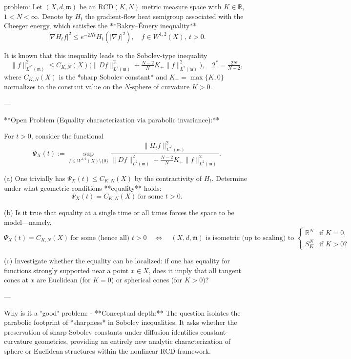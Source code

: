 problem:  
Let \((X,d,\mathfrak{m})\) be an \(\mathrm{RCD}(K,N)\) metric measure space with \(K \in \mathbb{R}\), \(1<N<\infty\).  
Denote by \(H_t\) the gradient-flow heat semigroup associated with the Cheeger energy, which satisfies the **Bakry–Émery inequality**
\[
|\nabla H_t f|^2 \le e^{-2Kt} H_t(|\nabla f|^2), \quad f \in W^{1,2}(X), \ t>0.
\]

It is known that this inequality leads to the Sobolev-type inequality
\[
\|f\|_{L^{2^*}(\mathfrak{m})}^2
\le C_{K,N}(X)\big(\|Df\|_{L^2(\mathfrak{m})}^2 + \tfrac{N-2}{N}K_+\|f\|_{L^2(\mathfrak{m})}^2\big),
\quad 2^*=\tfrac{2N}{N-2},
\]
where \(C_{K,N}(X)\) is the *sharp Sobolev constant* and \(K_+ = \max\{K,0\}\) normalizes to the constant value on the \(N\)-sphere of curvature \(K>0\).

---

**Open Problem (Equality characterization via parabolic invariance):**  

For \(t>0\), consider the functional  
\[
\Psi_X(t)
:= \sup_{f\in W^{1,2}(X)\setminus\{0\}}
\frac{\|H_t f\|_{L^{2^*}(\mathfrak{m})}^2}{
\|Df\|_{L^2(\mathfrak{m})}^2 + \tfrac{N-2}{N}K_+\|f\|_{L^2(\mathfrak{m})}^2}.
\]

(a) One trivially has \(\Psi_X(t)\le C_{K,N}(X)\) by the contractivity of \(H_t\).  
Determine under what geometric conditions **equality** holds:
\[
\Psi_X(t)=C_{K,N}(X)\ \text{for some }t>0.
\]

(b) Is it true that equality at a single time or all times forces the space to be model—namely,
\[
\Psi_X(t)=C_{K,N}(X)\ \text{for some (hence all) }t>0
\quad\Longleftrightarrow\quad
(X,d,\mathfrak{m})\text{ is isometric (up to scaling) to } 
\begin{cases}
\mathbb{R}^N & \text{if }K=0,\\
S^N_K & \text{if }K>0 ?
\end{cases}
\]

(c) Investigate whether the equality can be localized: if one has equality for functions strongly supported near a point \(x\in X\), does it imply that all tangent cones at \(x\) are Euclidean (for \(K=0\)) or spherical cones (for \(K>0\))?

---

Why is it a "good" problem:  
- **Conceptual depth:** The question isolates the parabolic footprint of *sharpness* in Sobolev inequalities. It asks whether the preservation of sharp Sobolev constants under diffusion identifies constant-curvature geometries, providing an entirely new analytic characterization of sphere or Euclidean structures within the nonlinear RCD framework.  

